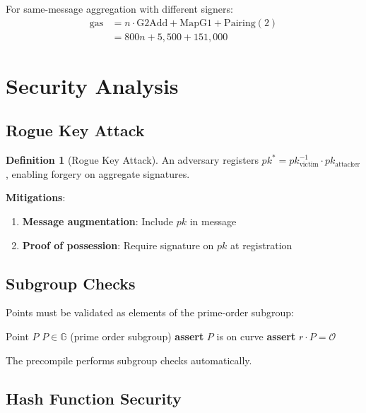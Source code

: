\documentclass[11pt,a4paper]{article}
\theoremstyle{definition}
\newtheorem{definition}{Definition}
\begin{document}
For same-message aggregation with different signers:
\begin{align}
\text{gas} &= n \cdot \text{G2Add} + \text{MapG1} + \text{Pairing}(2) \\
&= 800n + 5,500 + 151,000
\end{align}

\section{Security Analysis}

\subsection{Rogue Key Attack}

\begin{definition}[Rogue Key Attack]
An adversary registers $pk^* = pk_{\text{victim}}^{-1} \cdot pk_{\text{attacker}}$, enabling forgery on aggregate signatures.
\end{definition}

\textbf{Mitigations}:
\begin{enumerate}
    \item \textbf{Message augmentation}: Include $pk$ in message
    \item \textbf{Proof of possession}: Require signature on $pk$ at registration
\end{enumerate}

\subsection{Subgroup Checks}

Points must be validated as elements of the prime-order subgroup:

\begin{algorithm}
\caption{Subgroup Check}
\begin{algorithmic}[1]
\Require Point $P$
\Ensure $P \in \mathbb{G}$ (prime order subgroup)
\State \textbf{assert} $P$ is on curve
\State \textbf{assert} $r \cdot P = \mathcal{O}$ 
\end{algorithmic}
\end{algorithm}

The precompile performs subgroup checks automatically.

\subsection{Hash Function Security}
\end{document}
